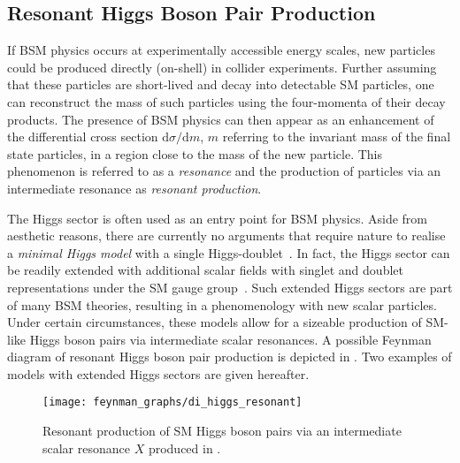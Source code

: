 

\subsection{Resonant Higgs Boson Pair Production}%
\label{sec:bsm_resonant_hh}

If BSM physics occurs at experimentally accessible energy scales, new particles
could be produced directly (on-shell) in collider experiments. Further assuming
that these particles are short-lived and decay into detectable SM particles, one
can reconstruct the mass of such particles using the four-momenta of their decay
products. The presence of BSM physics can then appear as an enhancement of the
differential cross section $\mathrm{d}\sigma / \mathrm{d}m$, $m$ referring to
the invariant mass of the final state particles, in a region close to the mass
of the new particle. This phenomenon is referred to as a \emph{resonance} and
the production of particles via an intermediate resonance as \emph{resonant
  production}.

The Higgs sector is often used as an entry point for BSM physics. Aside from
aesthetic reasons, there are currently no arguments that require nature to
realise a \emph{minimal Higgs model} with a single
Higgs-doublet~\cite{Gunion:1989we}. In fact, the Higgs sector can be readily
extended with additional scalar fields with singlet and doublet representations
under the SM gauge group~\cite{Gunion:1989we}. Such extended Higgs sectors are
part of many BSM theories, resulting in a phenomenology with new scalar
particles. Under certain circumstances, these models allow for a sizeable
production of SM-like Higgs boson pairs via intermediate scalar resonances. A
possible Feynman diagram of resonant Higgs boson pair production is depicted in
. Two examples of models with extended Higgs
sectors are given hereafter.

\begin{figure}[htbp]
  \centering

  \texttt{[image: feynman\_graphs/di\_higgs\_resonant]}

  \caption[Feynman diagram of resonant Higgs boson pair production.]{Resonant
    production of SM Higgs boson pairs via an intermediate scalar resonance $X$
    produced in \ggF.}%
  \label{fig:resonant_production_feyn}
\end{figure}

